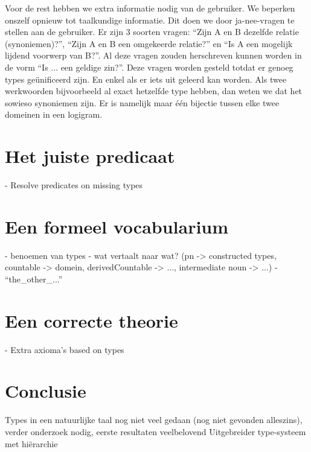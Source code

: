 Voor de rest hebben we extra informatie nodig van de gebruiker. We beperken onszelf opnieuw tot taalkundige informatie. Dit doen we door ja-nee-vragen te stellen aan de gebruiker. Er zijn 3 soorten vragen: ``Zijn A en B dezelfde relatie (synoniemen)?'', ``Zijn A en B een omgekeerde relatie?'' en ``Is A een mogelijk lijdend voorwerp van B?''. Al deze vragen zouden herschreven kunnen worden in de vorm ``Is ... een geldige zin?''. Deze vragen worden gesteld totdat er genoeg types geünificeerd zijn. En enkel als er iets uit geleerd kan worden. Als twee werkwoorden bijvoorbeeld al exact hetzelfde type hebben, dan weten we dat het sowieso synoniemen zijn. Er is namelijk maar één bijectie tussen elke twee domeinen in een logigram.

\section{Het juiste predicaat}
- Resolve predicates on missing types
\section{Een formeel vocabularium}
- benoemen van types
- wat vertaalt naar wat? (pn -> constructed types, countable -> domein, derivedCountable -> ..., intermediate noun -> ...)
- ``the_other_...''
\section{Een correcte theorie}
- Extra axioma's based on types

\section{Conclusie}
Types in een natuurlijke taal nog niet veel gedaan (nog niet gevonden alleszins), verder onderzoek nodig, eerste resultaten veelbelovend
Uitgebreider type-systeem met hiërarchie
